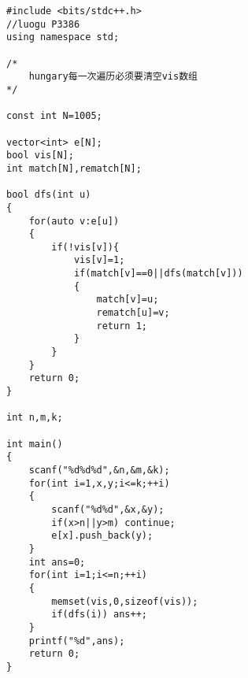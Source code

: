\begin{lstlisting}
#include <bits/stdc++.h>
//luogu P3386
using namespace std;

/*
	hungary每一次遍历必须要清空vis数组
*/

const int N=1005;

vector<int> e[N];
bool vis[N];
int match[N],rematch[N];

bool dfs(int u)
{
	for(auto v:e[u])
	{
		if(!vis[v]){
			vis[v]=1;
			if(match[v]==0||dfs(match[v]))
			{
				match[v]=u;
				rematch[u]=v;
				return 1;
			}
		}
	}
	return 0;
}

int n,m,k;

int main()
{
	scanf("%d%d%d",&n,&m,&k);
	for(int i=1,x,y;i<=k;++i)
	{
		scanf("%d%d",&x,&y);
		if(x>n||y>m) continue;
		e[x].push_back(y);
	}
	int ans=0;
	for(int i=1;i<=n;++i)
	{
		memset(vis,0,sizeof(vis));
		if(dfs(i)) ans++;
	}
	printf("%d",ans);
	return 0;
}
\end{lstlisting}